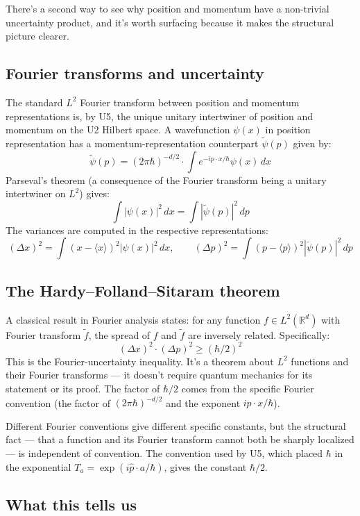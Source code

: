 \documentclass[11pt,a4paper]{article}
\begin{document}
There's a second way to see why position and momentum have a non-trivial uncertainty product, and it's worth surfacing because it makes the structural picture clearer.

\subsection{Fourier transforms and uncertainty}

The standard $L^2$ Fourier transform between position and momentum representations is, by U5, the unique unitary intertwiner of position and momentum on the U2 Hilbert space. A wavefunction $\psi(x)$ in position representation has a momentum-representation counterpart $\tilde\psi(p)$ given by:
\[
\tilde\psi(p) = (2\pi\hbar)^{-d/2}\cdot\int e^{-ip\cdot x/\hbar}\psi(x)\, dx
\]
Parseval's theorem (a consequence of the Fourier transform being a unitary intertwiner on $L^2$) gives:
\[
\int|\psi(x)|^{2}\, dx = \int|\tilde\psi(p)|^{2}\, dp
\]
The variances are computed in the respective representations:
\[
(\Delta x)^{2} = \int(x - \langle x\rangle)^{2}|\psi(x)|^{2}\, dx, \qquad (\Delta p)^{2} = \int(p - \langle p\rangle)^{2}|\tilde\psi(p)|^{2}\, dp
\]

\subsection{The Hardy--Folland--Sitaram theorem}

A classical result in Fourier analysis states: for any function $f \in L^2(\mathbb{R}^d)$ with Fourier transform $\tilde f$, the spread of $f$ and $\tilde f$ are inversely related. Specifically:
\[
(\Delta x)^{2}\cdot(\Delta p)^{2} \geq (\hbar/2)^{2}
\]
This is the Fourier-uncertainty inequality. It's a theorem about $L^2$ functions and their Fourier transforms --- it doesn't require quantum mechanics for its statement or its proof. The factor of $\hbar/2$ comes from the specific Fourier convention (the factor of $(2\pi\hbar)^{-d/2}$ and the exponent $ip\cdot x/\hbar$).

Different Fourier conventions give different specific constants, but the structural fact --- that a function and its Fourier transform cannot both be sharply localized --- is independent of convention. The convention used by U5, which placed $\hbar$ in the exponential $T_a = \exp(i\hat{p}\cdot a/\hbar)$, gives the constant $\hbar/2$.

\subsection{What this tells us}
\end{document}

